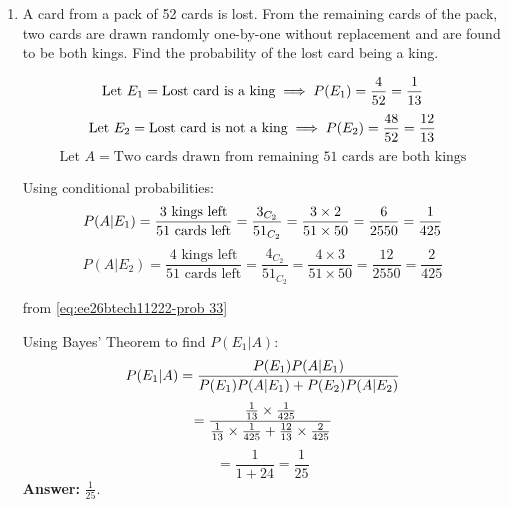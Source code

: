 \begin{enumerate}[label=\thesubsection.\arabic*, ref=\thesubsection.\theenumi]
$$
\Delta = (1 + xyz)(y - x)(z - x) [1 \cdot (z + x - (y + x))] \\$$
$$= (1 + xyz)(y - x)(z - x)(z - y) \\$$
$$= (1 + xyz)(x - y)(y - z)(z - x)
$$

We are given that $\Delta = 0$:
$$(1 + xyz)(x - y)(y - z)(z - x) = 0$$

Since $x, y, z$ are distinct, $(x - y) \neq 0$, $(y - z) \neq 0$, and $(z - x) \neq 0$.

Therefore:
$$1 + xyz = 0$$



\item

A card from a pack of 52 cards is lost. From the remaining cards of the pack, two cards are drawn randomly one-by-one without replacement and are found to be both kings. Find the probability of the lost card being a king.   

\solution 

$$
\text{Let } E_1 = \text{Lost card is a king} \implies P(E_1) = \frac{4}{52} = \frac{1}{13} \\$$
$$\text{Let } E_2 = \text{Lost card is not a king} \implies P(E_2) = \frac{48}{52} = \frac{12}{13} \\$$
$$\text{Let } A = \text{Two cards drawn from remaining 51 cards are both kings}$$


Using conditional probabilities:
$$
P(A | E_1) = \frac{\text{3 kings left}}{\text{51 cards left}} = \frac{3_{C_2}}{51_{C_2}} = \frac{3 \times 2}{51 \times 50} = \frac{6}{2550} = \frac{1}{425} \\$$
$$P(A | E_2) = \frac{\text{4 kings left}}{\text{51 cards left}} = \frac{4_{C_2}}{51_{C_2}} = \frac{4 \times 3}{51 \times 50} = \frac{12}{2550} = \frac{2}{425}$$

from \eqref{eq:ee26btech11222-prob 33}

Using Bayes' Theorem to find $P(E_1 | A)$:
$$
P(E_1 | A) = \frac{P(E_1)P(A | E_1)}{P(E_1)P(A | E_1) + P(E_2)P(A | E_2)} \\$$
$$= \frac{\frac{1}{13} \times \frac{1}{425}}{\frac{1}{13} \times \frac{1}{425} + \frac{12}{13} \times \frac{2}{425}} \\$$
$$= \frac{1}{1 + 24} = \frac{1}{25}
$$
\textbf{Answer:} $\frac{1}{25}$.






\end{enumerate}



